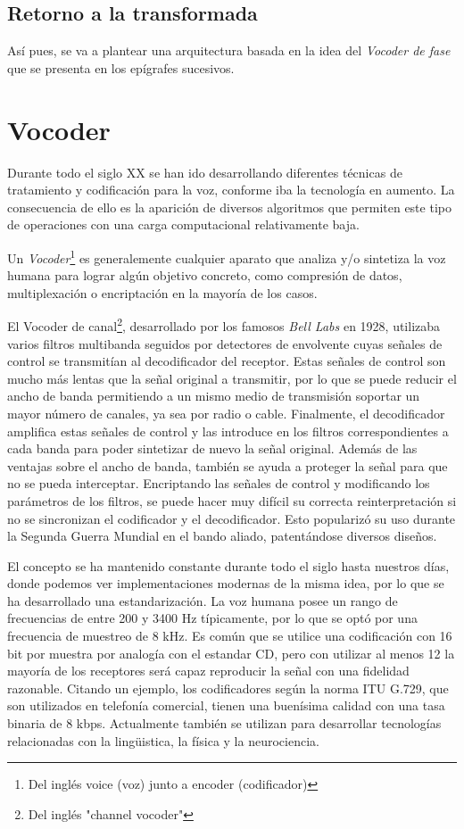 \subsection{Retorno a la transformada}
Así pues, se va a plantear una arquitectura basada en la idea del \emph{Vocoder de fase} que se presenta en los epígrafes sucesivos.
\section{Vocoder}
Durante todo el siglo XX se han ido desarrollando diferentes técnicas de tratamiento y codificación para la voz, conforme iba la tecnología en aumento. La consecuencia de ello es la aparición de diversos algoritmos que permiten este tipo de operaciones con una carga computacional relativamente baja. 

Un \emph{Vocoder}\footnote{Del inglés voice (voz) junto a encoder (codificador)} es generalemente cualquier aparato que analiza y/o sintetiza la voz humana para lograr  algún objetivo concreto, como compresión de datos, multiplexación o encriptación en la mayoría de los casos.

El Vocoder de canal\footnote{Del inglés "channel vocoder"}, desarrollado por los famosos \emph{Bell Labs} en 1928, utilizaba varios filtros multibanda seguidos por detectores de envolvente cuyas señales de control se transmitían al decodificador del receptor. Estas señales de control son mucho más lentas que la señal original a transmitir, por lo que se puede reducir el ancho de banda permitiendo a un mismo medio de transmisión soportar un mayor número de canales, ya sea por radio o cable. Finalmente, el decodificador amplifica estas señales de control y las introduce en los filtros correspondientes a cada banda para poder sintetizar de nuevo la señal original. Además de las ventajas sobre el ancho de banda, también se ayuda a proteger la señal para que no se pueda interceptar. Encriptando las señales de control y modificando los parámetros de los filtros, se puede hacer muy difícil su correcta reinterpretación si no se sincronizan el codificador y el decodificador. Esto popularizó su uso durante la Segunda Guerra Mundial en el bando aliado, patentándose diversos diseños.

El concepto se ha mantenido constante durante todo el siglo hasta nuestros días, donde podemos ver implementaciones modernas de la misma idea, por lo que se ha desarrollado una estandarización. La voz humana posee un rango de frecuencias de entre 200 y 3400 Hz típicamente, por lo que se optó por una frecuencia de muestreo de 8 kHz. Es común que se utilice una codificación con 16 bit por muestra por analogía con el estandar CD, pero con utilizar al menos 12 la mayoría de los receptores será capaz reproducir la señal con una fidelidad razonable. Citando un ejemplo, los codificadores según la norma ITU G.729, que son utilizados en telefonía comercial, tienen una buenísima calidad con una tasa binaria de 8 kbps. Actualmente también se utilizan para desarrollar tecnologías relacionadas con la lingüistica, la física y la neurociencia.

